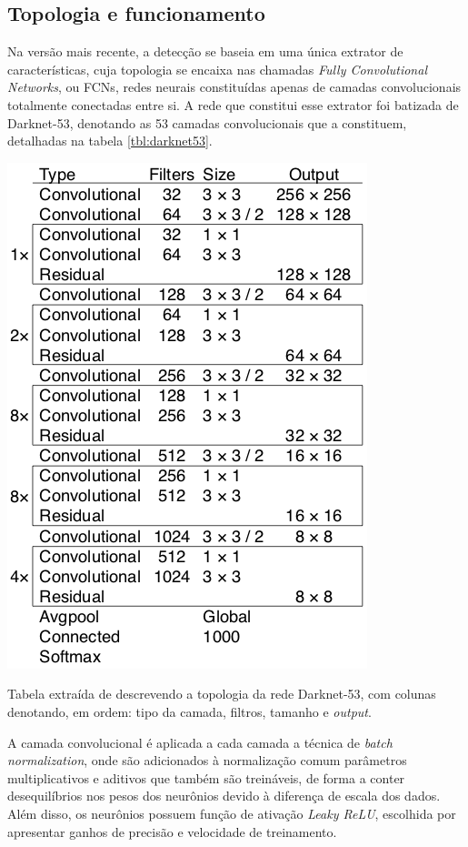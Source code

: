 \documentclass[]{politex}
\begin{document}
\subsection{Topologia e funcionamento}

Na versão mais recente, a detecção se baseia em uma única extrator de características, cuja topologia se encaixa nas chamadas \textit{Fully Convolutional Networks}, ou FCNs, redes neurais constituídas apenas de camadas convolucionais totalmente conectadas entre si. A rede que constitui esse extrator foi batizada de Darknet-53, denotando as 53 camadas convolucionais que a constituem, detalhadas na tabela \ref{tbl:darknet53}.

\begin{table}[ht]
  \centering
  \includegraphics[scale=0.5]{img/darknet53.png}
  \caption{Tabela extraída de \citeyear{yolov3} \citeauthor{yolov3} descrevendo a topologia da rede Darknet-53, com colunas denotando, em ordem: tipo da camada, filtros, tamanho e \textit{output}.}
  \label{tbl:darknet53}
\end{table}

A camada convolucional é aplicada a cada camada a técnica de \textit{batch normalization}, onde são adicionados à normalização comum parâmetros multiplicativos e aditivos que também são treináveis, de forma a conter desequilíbrios nos pesos dos neurônios devido à diferença de escala dos dados. Além disso, os neurônios possuem função de ativação \textit{Leaky ReLU}, escolhida por apresentar ganhos de precisão e velocidade de treinamento.
\end{document}
